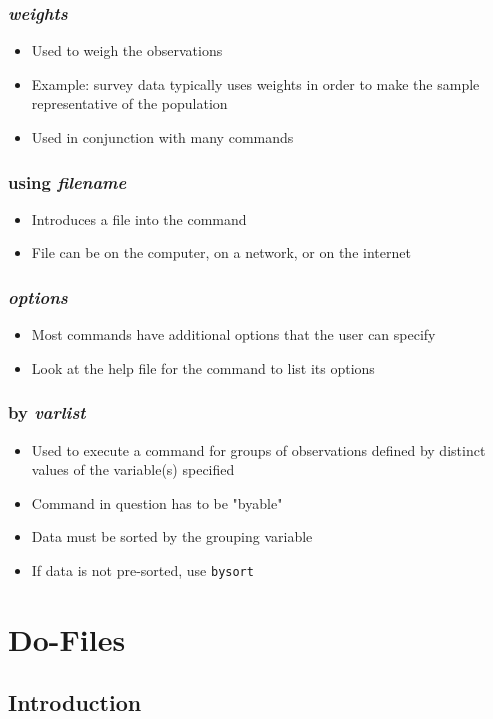 \documentclass{beamer}
\begin{document}
\begin{frame}
	\frametitle{\textit{weights}}
		\begin{itemize}
			\item Used to weigh the observations
			\item Example: survey data typically uses weights in order to make the sample representative of the population
			\item Used in conjunction with many commands
		\end{itemize}
\end{frame}

\begin{frame}
	\frametitle{using \textit{filename}}
		\begin{itemize}
			\item Introduces a file into the command
			\item File can be on the computer, on a network, or on the internet
		\end{itemize}
\end{frame}

\begin{frame}
	\frametitle{\textit{options}}
		\begin{itemize}
			\item Most commands have additional options that the user can specify
			\item Look at the help file for the command to list its options
		\end{itemize}
\end{frame}

\begin{frame}
	\frametitle{by \textit{varlist}}
		\begin{itemize}
			\item Used to execute a command for groups of observations defined by distinct values of the variable(s) specified
			\item Command in question has to be "byable"
			\item Data must be sorted by the grouping variable
			\item If data is not pre-sorted, use \texttt{bysort}
		\end{itemize}
\end{frame}

\section{Do-Files}

\subsection{Introduction}
\end{document}

